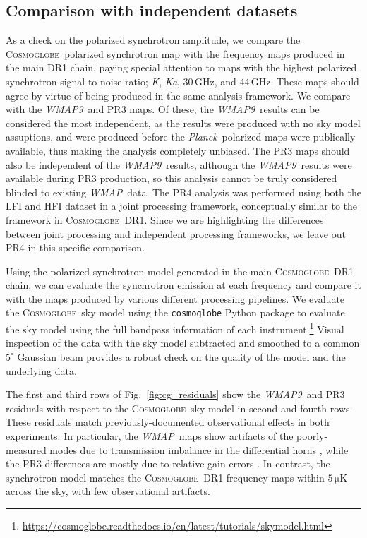 \documentclass[twocolumn]{../../common/aa}
\def\WMAP{\emph{WMAP}}
\def\WMAPnine{\emph{WMAP9}}
\def\Planck{\emph{Planck}}
\newcommand{\red}[0]{\color{red}}
\newcommand{\cosmoglobe}{\textsc{Cosmoglobe}}
\newcommand{\K}[0]{\textit K}
\newcommand{\Ka}[0]{\textit{Ka}}
\begin{document}
\subsection{Comparison with independent datasets}

As a check on the polarized synchrotron amplitude, we compare the \cosmoglobe\ polarized synchrotron map with the frequency maps produced in the main DR1 chain, paying special attention to maps with the highest polarized synchrotron signal-to-noise ratio; \K, \Ka, 30\,GHz, and 44\,GHz. These maps should agree by virtue of being produced in the same analysis framework. We compare with the \WMAPnine\ and PR3 maps. Of these, the \WMAPnine\ results can be considered the most independent, as the results were produced with no sky model assuptions, and were produced before the \Planck\ polarized maps were publically available, thus making the analysis completely unbiased. The PR3 maps should also be independent of the \WMAPnine\ results, although the \WMAPnine\ results were available during PR3 production, so this analysis cannot be truly considered blinded to existing \WMAP\ data.
The PR4 analysis was performed using both the LFI and HFI dataset in a joint processing framework, conceptually similar to the framework in \cosmoglobe\ DR1. Since we are highlighting the differences between joint processing and independent processing frameworks, we leave out PR4 in this specific comparison.


Using the polarized synchrotron model generated in the main \cosmoglobe\ DR1 chain, we can evaluate the synchrotron emission at each frequency and compare it with the maps produced by various different processing pipelines. We evaluate the \cosmoglobe\ sky model using the \texttt{cosmoglobe} Python package to evaluate the sky model using the full bandpass information of each instrument.\footnote{\url{https://cosmoglobe.readthedocs.io/en/latest/tutorials/skymodel.html}} Visual inspection of the data with the sky model subtracted and smoothed to a common $5^\circ$ Gaussian beam provides a robust check on the quality of the model and the underlying data.


The first and third rows of Fig.~\ref{fig:cg_residuals} show the \WMAPnine\ and PR3 residuals with respect to the \cosmoglobe\ sky model {\red in second and fourth rows}. These residuals match previously-documented observational effects in both experiments. In particular, the \WMAP\ maps show artifacts of the poorly-measured modes due to transmission imbalance in the differential horns \citep{jarosik2007,bennett2012}, while the PR3  differences are mostly  due to relative gain errors \citep{planck2016-l02,planck2020-LVII}.
In contrast, the synchrotron model matches the \cosmoglobe\ DR1 frequency maps within $5\,\mathrm{\mu K}$ across the sky, with few observational artifacts.
\end{document}
